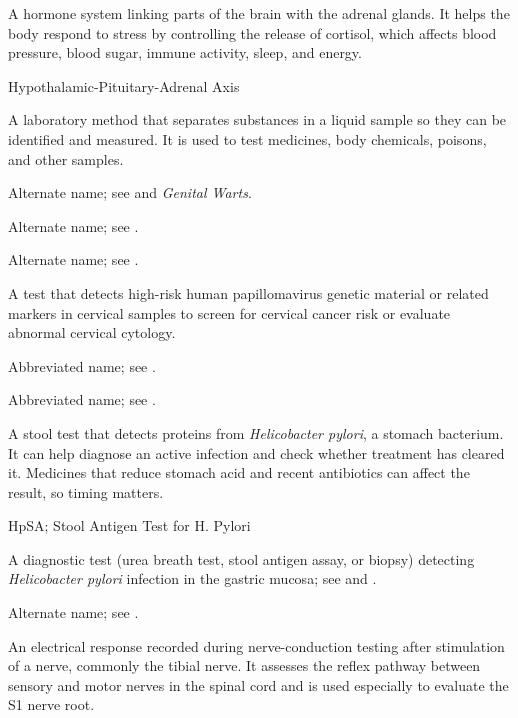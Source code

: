  A hormone system linking parts of the brain with the adrenal glands. It helps the body respond to stress by controlling the release of cortisol, which affects blood pressure, blood sugar, immune activity, sleep, and energy.

\synonyms
Hypothalamic-Pituitary-Adrenal Axis

 A laboratory method that separates substances in a liquid sample so they can be identified and measured. It is used to test medicines, body chemicals, poisons, and other samples.

 Alternate name; see  and \textit{Genital Warts}.

 Alternate name; see .

 Alternate name; see .

 A test that detects high-risk human papillomavirus genetic material or related markers in cervical samples to screen for cervical cancer risk or evaluate abnormal cervical cytology.

 Abbreviated name; see .

 Abbreviated name; see .

 A stool test that detects proteins from \textit{Helicobacter pylori}, a stomach bacterium. It can help diagnose an active infection and check whether treatment has cleared it. Medicines that reduce stomach acid and recent antibiotics can affect the result, so timing matters.

\synonyms
HpSA; Stool Antigen Test for H. Pylori

 A diagnostic test (urea breath test, stool antigen assay, or biopsy) detecting \textit{Helicobacter pylori} infection in the gastric mucosa; see  and .

 Alternate name; see .

 An electrical response recorded during nerve-conduction testing after stimulation of a nerve, commonly the tibial nerve. It assesses the reflex pathway between sensory and motor nerves in the spinal cord and is used especially to evaluate the S1 nerve root.

